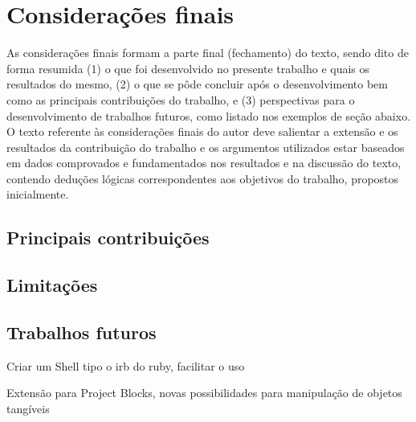 \chapter{Considerações finais}
\label{cap:fim}


As considerações finais formam a parte final (fechamento) do texto, sendo dito
de forma resumida (1) o que foi desenvolvido no presente trabalho e quais os
resultados do mesmo, (2) o que se pôde concluir após o desenvolvimento bem como
as principais contribuições do trabalho, e (3) perspectivas para o
desenvolvimento de trabalhos futuros, como listado nos exemplos de seção abaixo.
O texto referente às considerações finais do autor deve salientar a extensão e
os resultados da contribuição do trabalho e os argumentos utilizados estar
baseados em dados comprovados e fundamentados nos resultados e na discussão do
texto, contendo deduções lógicas correspondentes aos objetivos do trabalho,
propostos inicialmente.


\section{Principais contribuições}



\section{Limitações}



\section{Trabalhos futuros}

Criar um Shell tipo o irb do ruby, facilitar o uso

Extensão para Project Blocks, novas possibilidades para manipulação de objetos tangíveis

